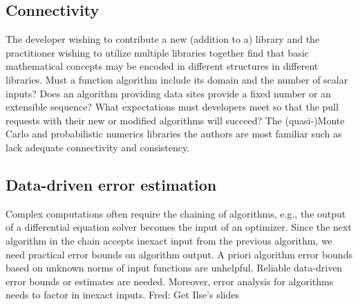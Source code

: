 \documentclass{amsart}
\newcommand{\FJHNote}[1]{{\color{blue}Fred: #1}}
\begin{document}
\subsection{Connectivity} 
The developer wishing to contribute a new (addition to a) library and the practitioner wishing to utilize multiple libraries together find that basic mathematical concepts may be encoded in different structures in different libraries.  Must a function algorithm include its domain and the number of scalar inputs?  Does an algorithm providing data sites provide a fixed number or an extensible sequence?  What expectations must developers meet so that the pull requests with their new or modified algorithms will succeed? The (quasi-)Monte Carlo and probabilistic numerics libraries  the authors are most familiar such as \cite{QMCPy2020a,SciPyQMC,Stan,probnum} lack  adequate connectivity and consistency.

\subsection{Data-driven error estimation} 
Complex computations often require the chaining of algorithms, e.g., the output of a differential equation solver becomes the input of an optimizer.  Since the next algorithm in the chain accepts inexact input from the previous algorithm, 
we need practical error bounds on algorithm output. A priori algorithm error bounds based on unknown norms of input functions are unhelpful.  Reliable data-driven error bounds or estimates are needed. Moreover, error analysis for algorithms needs to factor in inexact inputs.
\FJHNote{Get Ilse's slides}
\end{document}
